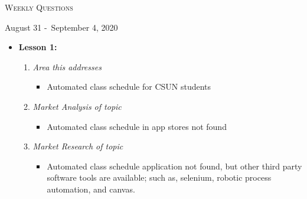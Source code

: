 \centerline{\LARGE\textsc{Weekly Questions}}
\centerline{August 31 -\ September 4, 2020}
\textbf{}
\begin{itemize}
  \item[] \textbf{\large Lesson 1:}
  \begin{enumerate}
    \item \textsl{Area this addresses}
    \begin{itemize}
      \item Automated class schedule for CSUN students
    \end{itemize}
    \item \textsl{Market Analysis of topic}
    \begin{itemize}
      \item Automated class schedule in app stores not found
    \end{itemize}
    \item \textsl{Market Research of topic}
    \begin{itemize}
      \item Automated class schedule application not found, but other
      third party software tools are available; such as, selenium,
      robotic process automation, and canvas.
    \end{itemize}
  \end{enumerate} 
\end{itemize}
\textbf{}
